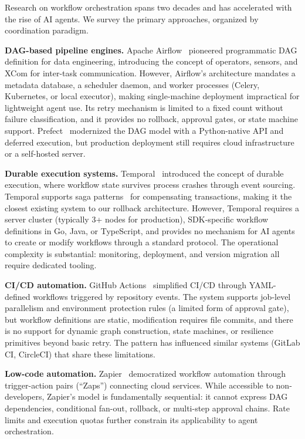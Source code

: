 \documentclass[10pt, twocolumn]{article}
\begin{document}
Research on workflow orchestration spans two decades and has accelerated with the rise of AI agents. We survey the primary approaches, organized by coordination paradigm.

\textbf{DAG-based pipeline engines.} Apache Airflow~\cite{airflow} pioneered programmatic DAG definition for data engineering, introducing the concept of operators, sensors, and XCom for inter-task communication. However, Airflow's architecture mandates a metadata database, a scheduler daemon, and worker processes (Celery, Kubernetes, or local executor), making single-machine deployment impractical for lightweight agent use. Its retry mechanism is limited to a fixed count without failure classification, and it provides no rollback, approval gates, or state machine support. Prefect~\cite{prefect} modernized the DAG model with a Python-native API and deferred execution, but production deployment still requires cloud infrastructure or a self-hosted server.

\textbf{Durable execution systems.} Temporal~\cite{temporal} introduced the concept of durable execution, where workflow state survives process crashes through event sourcing. Temporal supports saga patterns~\cite{garcia2015saga} for compensating transactions, making it the closest existing system to our rollback architecture. However, Temporal requires a server cluster (typically 3+ nodes for production), SDK-specific workflow definitions in Go, Java, or TypeScript, and provides no mechanism for AI agents to create or modify workflows through a standard protocol. The operational complexity is substantial: monitoring, deployment, and version migration all require dedicated tooling.

\textbf{CI/CD automation.} GitHub Actions~\cite{ghactions} simplified CI/CD through YAML-defined workflows triggered by repository events. The system supports job-level parallelism and environment protection rules (a limited form of approval gate), but workflow definitions are static, modification requires file commits, and there is no support for dynamic graph construction, state machines, or resilience primitives beyond basic retry. The pattern has influenced similar systems (GitLab CI, CircleCI) that share these limitations.

\textbf{Low-code automation.} Zapier~\cite{zapier} democratized workflow automation through trigger-action pairs (``Zaps'') connecting cloud services. While accessible to non-developers, Zapier's model is fundamentally sequential: it cannot express DAG dependencies, conditional fan-out, rollback, or multi-step approval chains. Rate limits and execution quotas further constrain its applicability to agent orchestration.
\end{document}
